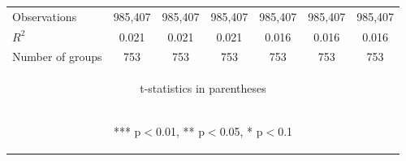 \documentclass[]{article}
\begin{document}
\begin{center}
\begin{tabular}{lcccccc}
        Observations     & 985,407                                        & 985,407                                        & 985,407                                        & 985,407                                        & 985,407                                        & 985,407                                        \\
        $R^2$            & 0.021                                          & 0.021                                          & 0.021                                          & 0.016                                          & 0.016                                          & 0.016                                          \\
        Number of groups & 753                                            & 753                                            & 753                                            & 753                                            & 753                                            & 753                                            \\ \hline
        \multicolumn{7}{c}{\begin{footnotesize} t-statistics in parentheses\end{footnotesize}}                                                                                                                                                                                                                                 \\
        \multicolumn{7}{c}{\begin{footnotesize} *** p$<$0.01, ** p$<$0.05, * p$<$0.1\end{footnotesize}}                                                                                                                                                                                                                        \\
    \end{tabular}
\end{center}
\end{document}
